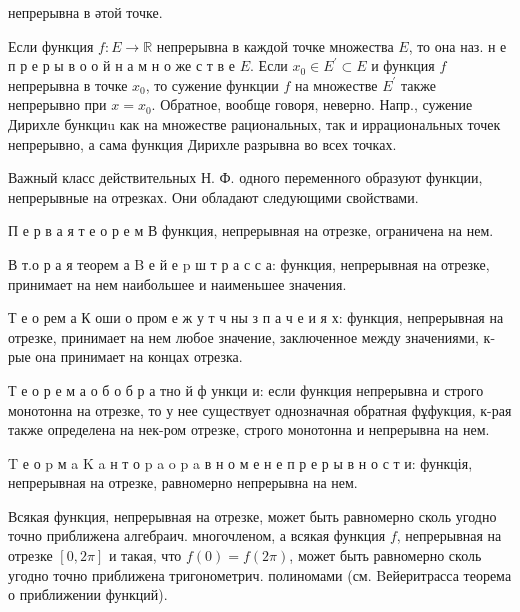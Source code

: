 \documentclass[10pt]{article}
\begin{document}
непрерывна в әтой точке.



Если функция $f: E \rightarrow \mathbb{R}$ непрерывна в каждой точке множества $E$, то она наз. н е п р е р ы в о о й н а м н о же с т в е $E$. Если $x_{0} \in E^{\prime} \subset E$ и функция $f$ непрерывна в точке $x_{0}$, то сужение функции $f$ на множестве $E^{\prime}$ также непрерывно при $x=x_{0}$. Обратное, вообще говоря, неверно. Напр., сужение Дирихле бункциu как на множестве рациональных, так и иррациональных точек непрерывно, а сама функция Дирихле разрывна во всех точках.



Важный класс действительных Н. Ф. одного переменного образуют функции, непрерывные на отрезках. Они обладают следующими свойствами.



П е р в а я т е о р е м В функция, непрерывная на отрезке, ограничена на нем.



В т.о р а я теорем а B е й е p ш т р а с с а: функция, непрерывная на отрезке, принимает на нем наибольшее и наименьшее значения.



Т е о рем а К оши о пром е ж у т ч ны з п а ч е и я х: функция, непрерывная на отрезке, принимает на нем любое значение, заключенное между значениями, к-рые она принимает на концах отрезка.



Т е о р е м а о б о б р а тно й ф ункци и: если функция непрерывна и строго монотонна на отрезке, то у нее существует однозначная обратная фұфукция, к-рая также определена на нек-ром отрезке, строго монотонна и непрерывна на нем.



T е о p м a K a н т о p a o p a в н о м е н е п р е р ы в н о с т и: функція, непрерывная на отрезке, равномерно непрерывна на нем.



Всякая функция, непрерывная на отрезке, может быть равномерно сколь угодно точно приближена алгебраич. многочленом, а всякая функция $f$, непрерывная на отрезке $[0,2 \pi]$ и такая, что $f(0)=f(2 \pi)$, может быть равномерно сколь угодно точно приближена тригонометрич. полиномами (см. Bейеритрасса теорема о приближении функций).
\end{document}
